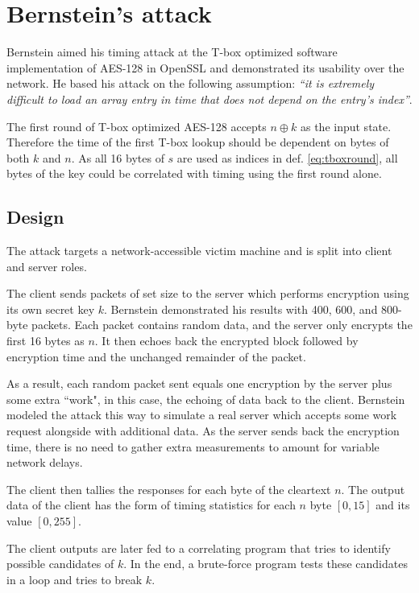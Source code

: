 \documentclass[thesis=B,english]{FITthesis}[2019/03/06]
\begin{document}
\section{Bernstein's attack}
Bernstein aimed his timing attack at the T-box optimized software implementation of AES-128 in OpenSSL and demonstrated its usability over the network.
He based his attack on the following assumption:
\textit{``it is extremely difficult to load an array entry in time that does not depend on the entry’s index''}\cite{bernstein2005cache}.

The first round of T-box optimized AES-128 accepts $n \oplus k$ as the input state.
Therefore the time of the first T-box lookup should be dependent on bytes of both $k$ and $n$.
As all 16 bytes of $s$ are used as indices in def. \ref{eq:tboxround}, all bytes of the key could be correlated with timing using the first round alone.

\subsection{Design}
The attack targets a network-accessible victim machine and is split into client and server roles.

The client sends packets of set size to the server which performs encryption using its own secret key $k$.
Bernstein demonstrated his results with 400, 600, and 800-byte packets.
Each packet contains random data, and the server only encrypts the first 16 bytes as $n$.
It then echoes back the encrypted block followed by encryption time and the unchanged remainder of the packet.

As a result, each random packet sent equals one encryption by the server plus some extra ``work", in this case, the echoing of data back to the client.
Bernstein modeled the attack this way to simulate a real server which accepts some work request alongside with additional data.
As the server sends back the encryption time, there is no need to gather extra measurements to amount for variable network delays.

The client then tallies the responses for each byte of the cleartext $n$.
The output data of the client has the form of timing statistics for each $n$ byte $[0,15]$ and its value $[0,255]$.

The client outputs are later fed to a correlating program that tries to identify possible candidates of $k$.
In the end, a brute-force program tests these candidates in a loop and tries to break $k$.
\end{document}

